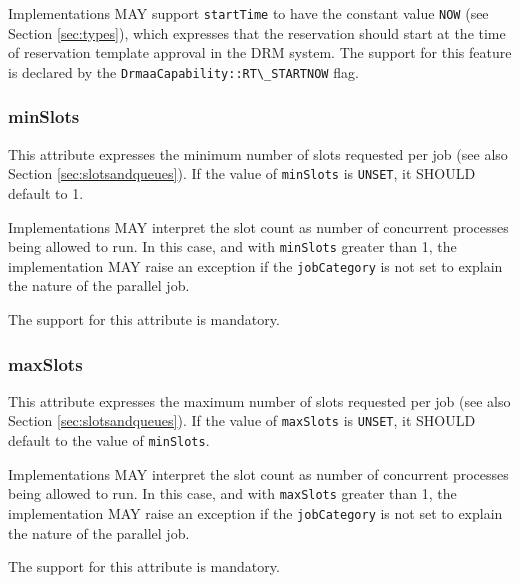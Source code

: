 \documentclass{article}
\newcommand{\h}[1]{\lstinline|#1|}
\newcommand{\rat}[1]{}
\begin{document}
Implementations MAY support \h{startTime} to have the constant value \h{NOW} (see Section \ref{sec:types}), which expresses that the reservation should start at the time of reservation template approval in the DRM system. The support for this feature is declared by the \h{DrmaaCapability::RT\_STARTNOW} flag.

\subsubsection{minSlots}
\label{sec:minslots}

This attribute expresses the minimum number of slots requested per job (see also Section \ref{sec:slotsandqueues}). If the value of \h{minSlots} is \h{UNSET}, it SHOULD default to 1.

Implementations MAY interpret the slot count as number of concurrent processes being allowed to run. In this case, and with \h{minSlots} greater than 1, the implementation MAY raise an exception if the \h{jobCategory} is not set to explain the nature of the parallel job.

The support for this attribute is mandatory.

\rat{The hint regarding number of concurrent processes intentionally does not speak about processes per host - this would create semantics for our opaque slot concept.}

\subsubsection{maxSlots}
\label{sec:maxslots}

This attribute expresses the maximum number of slots requested per job (see also Section \ref{sec:slotsandqueues}). If the value of \h{maxSlots} is \h{UNSET}, it SHOULD default to the value of \h{minSlots}.

Implementations MAY interpret the slot count as number of concurrent processes being allowed to run. In this case, and with \h{maxSlots} greater than 1, the implementation MAY raise an exception if the \h{jobCategory} is not set to explain the nature of the parallel job.

The support for this attribute is mandatory.

\rat{Conf call June 29th 2011: For maxSlots > 1, the demand for a job category is intentionally only MAY. This is reasoned by the fact that in most DRM systems,  advance reservation is a concept that is independent to the jobs that are later used in this reservation. So you are just requesting just some container, and you do not have to specify at this moment what kind of jobs do you want to run using this reservation (e.g. OpenMP, OpenMPI, MPICH). However, some systems need that information, so we leave it to the implementation how to deal with that.
}
\end{document}
